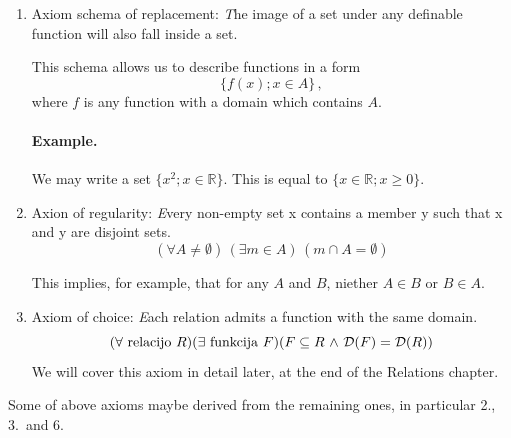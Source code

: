 \documentclass[11pt,paper=b5,footinclude,headinclude]{scrbook} %
\def\inn {{~\wedge~}}
\def\sledi {{~\Rightarrow~}}
\def\cee {{~\Leftrightarrow~}}
\theoremstyle{remark}
\theoremstyle{definition} %
\begin{document}
\begin{enumerate}
	
	\item Axiom schema of replacement: {\emph The image of a set under any definable function will also fall inside a set.}
	
	This schema allows us to describe functions in a form
	$$\{f(x); x\in A\}\,,$$
	where $f$ is any function with a domain which contains $A$.
	
	\paragraph{Example.} We may write a set $\{x^2; x\in \mathbb{R}\}$. This is equal to $\{x\in \mathbb{R}; x\ge 0\}$.
	
	
	\item Axion of regularity: {\emph Every non-empty set x contains a member y such that x and y are disjoint sets.}
	$$(\forall A\neq \emptyset)\,(\exists m\in A)\,(m\cap A = \emptyset)$$
	
	This implies, for example, that for any $A$ and $B$,  niether $A\in B$ or $B\in A$.


	\item Axiom of choice: {\emph Each relation admits a function with the same domain.}
	$$(\forall \textrm{ relacijo }R)(\exists \textrm{ funkcija }F)(F\subseteq R \inn {\cal D}(F) = {\cal D}(R))$$
	We will cover this axiom in detail later, at the end of the Relations chapter.
\end{enumerate}
\noindent Some of above axioms maybe derived from the remaining ones, in particular 2., 3.~and 6.
\end{document}
